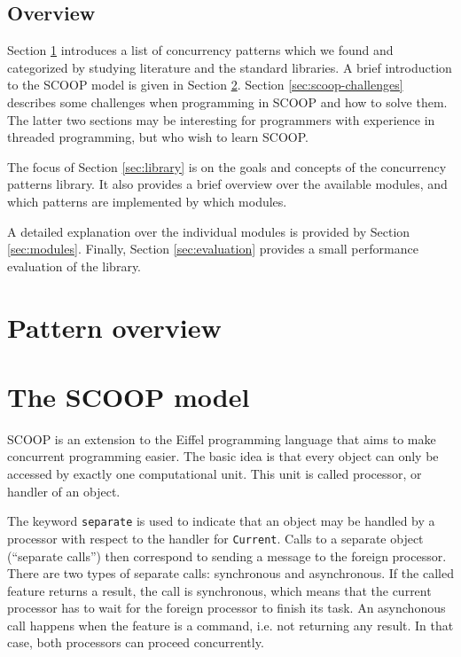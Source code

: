 \documentclass[a4paper,10pt]{article}
\begin{document}
\subsection{Overview}

Section \ref{sec:pattern_overview} introduces a list of concurrency patterns which we found and categorized by studying literature and the standard libraries.
A brief introduction to the SCOOP model is given in Section \ref{sec:scoop-model}.
Section \ref{sec:scoop-challenges} describes some challenges when programming in SCOOP and how to solve them.
The latter two sections may be interesting for programmers with experience in threaded programming, but who wish to learn SCOOP.

The focus of Section \ref{sec:library} is on the goals and concepts of the concurrency patterns library.
It also provides a brief overview over the available modules, and which patterns are implemented by which modules.

A detailed explanation over the individual modules is provided by Section \ref{sec:modules}.
Finally, Section \ref{sec:evaluation} provides a small performance evaluation of the library.

\section {Pattern overview}
\label{sec:pattern_overview}



\section {The SCOOP model}
\label {sec:scoop-model}

SCOOP is an extension to the Eiffel programming language that aims to make concurrent programming easier.
The basic idea is that every object can only be accessed by exactly one computational unit.
This unit is called processor, or handler of an object.

The keyword \lstinline!separate! is used to indicate that an object may be handled by a processor with respect to the handler for \lstinline!Current!.
Calls to a separate object (``separate calls'') then correspond to sending a message to the foreign processor.
There are two types of separate calls: synchronous and asynchronous.
If the called feature returns a result, the call is synchronous, which means that the current processor has to wait for the foreign processor to finish its task.
An asynchonous call happens when the feature is a command, i.e. not returning any result.
In that case, both processors can proceed concurrently.
\end{document}
